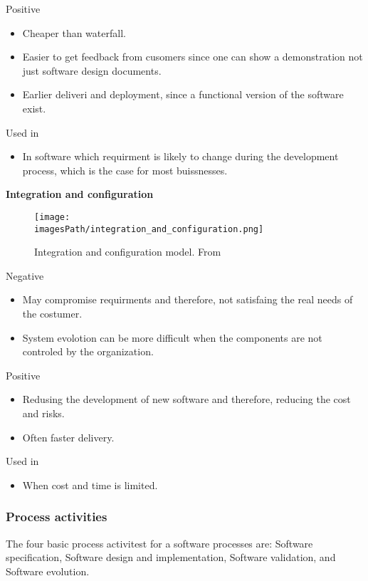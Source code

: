 Positive
\begin{itemize}
  \item Cheaper than waterfall.
  \item Easier to get feedback from cusomers since one can show a demonstration not just software design documents.
  \item Earlier deliveri and deployment, since a functional version of the software exist.
\end{itemize}

Used in
\begin{itemize}
  \item In software which requirment is likely to change during the development process, which is the case for most buissnesses.
\end{itemize}


\textbf{Integration and configuration}
\begin{figure}[!ht]
    \centering
    \texttt{[image: \\imagesPath/integration\_and\_configuration.png]}
    \caption{Integration and configuration model. From \cite{}}
\end{figure}

Negative
\begin{itemize}
  \item May compromise requirments and therefore, not satisfaing the real needs of the costumer.
  \item System evolotion can be more difficult when the components are not controled by the organization.
\end{itemize}

Positive
\begin{itemize}
  \item Redusing the development of new software and therefore, reducing the cost and risks.
  \item Often faster delivery.
\end{itemize}

Used in
\begin{itemize}
  \item When cost and time is limited.
\end{itemize}

\subsubsection{Process activities}
The four basic process activitest for a software processes are: Software specification, Software design and implementation, Software validation, and Software evolution.

